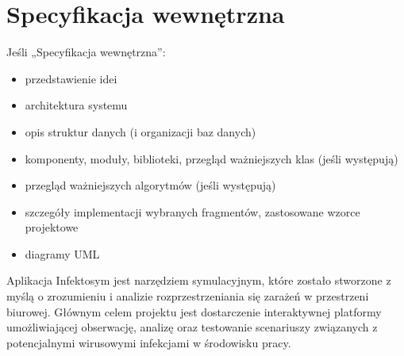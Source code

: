 \chapter{Specyfikacja wewnętrzna}
\label{ch:05}


Jeśli „Specyfikacja wewnętrzna”:
\begin{itemize}
\item przedstawienie idei
\item architektura systemu
\item opis struktur danych (i organizacji baz danych)
\item komponenty, moduły, biblioteki, przegląd ważniejszych klas (jeśli występują)
\item przegląd ważniejszych algorytmów (jeśli występują)
\item szczegóły implementacji wybranych fragmentów, zastosowane wzorce projektowe
\item diagramy UML
\end{itemize}

Aplikacja Infektosym jest narzędziem symulacyjnym, które zostało stworzone z myślą o zrozumieniu i analizie rozprzestrzeniania się zarażeń w przestrzeni biurowej. Głównym celem projektu jest dostarczenie interaktywnej platformy umożliwiającej obserwację, analizę oraz testowanie scenariuszy związanych z potencjalnymi wirusowymi infekcjami w środowisku pracy.

